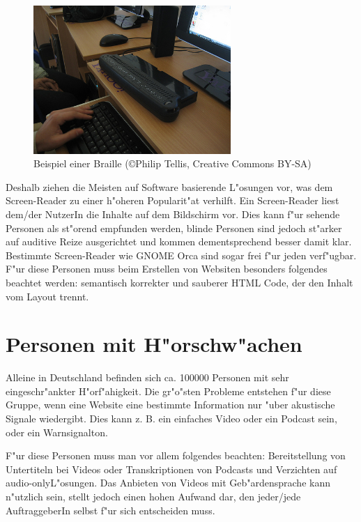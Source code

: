 \documentclass[a4paper,bibtotoc,oneside]{scrbook}
\begin{document}
\begin{figure}[braille]
\centering
\includegraphics[width=75mm]{braille}
\caption[Beschriftung eines Buchr"uckens.]{Beispiel einer Braille (\copyright  Philip Tellis, Creative Commons BY-SA)}\label{Abb1}
\end{figure}

Deshalb ziehen die Meisten auf Software basierende L"osungen vor, was dem Screen-Reader zu einer h"oheren Popularit"at verhilft\cite[S. 249-250]{screen_read_frust}. Ein Screen-Reader liest dem/der NutzerIn die Inhalte auf dem Bildschirm vor. Dies kann f"ur sehende Personen als st"orend empfunden werden, blinde Personen sind jedoch st"arker auf auditive Reize ausgerichtet und kommen dementsprechend besser damit klar\cite[S. 13]{barr_webd}. Bestimmte Screen-Reader wie GNOME Orca \cite{orca} sind sogar frei f"ur jeden verf"ugbar. 
F"ur diese Personen muss beim Erstellen von Websiten besonders folgendes beachtet werden: semantisch korrekter und sauberer HTML Code, der den Inhalt vom Layout trennt.\cite[S. 13-15]{barr_webd}

\section{Personen mit H"orschw"achen}
Alleine in Deutschland befinden sich ca. 100000 Personen mit sehr eingeschr"ankter H"orf"ahigkeit\cite[S. 17]{barr_webd}. Die gr"o"sten Probleme entstehen f"ur diese Gruppe, wenn eine Website eine bestimmte Information nur "uber akustische Signale wiedergibt. Dies kann z. B. ein einfaches Video oder ein Podcast sein, oder ein Warnsignalton. \cite[S. 17]{barr_webd}\cite[S. 20]{understand_acc}

F"ur diese Personen muss man vor allem folgendes beachten: Bereitstellung von Untertiteln bei Videos oder Transkriptionen von Podcasts und Verzichten auf \glqq audio-only\grqq L"osungen. Das Anbieten von Videos mit Geb"ardensprache kann n"utzlich sein, stellt jedoch einen hohen Aufwand dar, den jeder/jede AuftraggeberIn selbst f"ur sich entscheiden muss. \cite[S. 17]{barr_webd}\cite[S. 20]{understand_acc}
\end{document}

